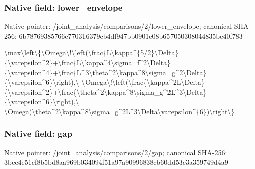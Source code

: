 \documentclass[10pt,a4paper]{article}
\begin{document}
\subsubsection{Native field: lower\_envelope}


Native pointer: /joint\_analysis/comparis\allowbreak{}ons/2/lower\_envelope; canonical SHA-256: 6b78769385766c770316379c\allowbreak{}b4df947bb0901e08b6570503\allowbreak{}08044835be40f783


\textbackslash{}max\textbackslash{}left\textbackslash{}\{\textbackslash{}Omega\textbackslash{}!\textbackslash{}left\allowbreak{}(\textbackslash{}frac\{L\textbackslash{}kappa\textasciicircum{}\{5/2\}\textbackslash{}Del\allowbreak{}ta\}\{\textbackslash{}varepsilon\textasciicircum{}2\}+\textbackslash{}frac\allowbreak{}\{L\textbackslash{}kappa\textasciicircum{}4\textbackslash{}sigma\_f\textasciicircum{}2\textbackslash{}Del\allowbreak{}ta\}\{\textbackslash{}varepsilon\textasciicircum{}4\}+\textbackslash{}frac\allowbreak{}\{L\textasciicircum{}3\textbackslash{}theta\textasciicircum{}2\textbackslash{}kappa\textasciicircum{}8\textbackslash{}sig\allowbreak{}ma\_g\textasciicircum{}2\textbackslash{}Delta\}\{\textbackslash{}varepsilo\allowbreak{}n\textasciicircum{}6\}\textbackslash{}right),\textbackslash{} \textbackslash{}Omega\textbackslash{}!\textbackslash{}left(\textbackslash{}frac\{\textbackslash{}kap\allowbreak{}pa\textasciicircum{}2L\textbackslash{}Delta\}\{\textbackslash{}varepsilon\allowbreak{}\textasciicircum{}2\}+\textbackslash{}frac\{\textbackslash{}theta\textasciicircum{}2\textbackslash{}kappa\allowbreak{}\textasciicircum{}8\textbackslash{}sigma\_g\textasciicircum{}2L\textasciicircum{}3\textbackslash{}Delta\}\{\textbackslash{}\allowbreak{}varepsilon\textasciicircum{}6\}\textbackslash{}right),\textbackslash{} \textbackslash{}Omega(\textbackslash{}theta\textasciicircum{}2\textbackslash{}kappa\textasciicircum{}8\textbackslash{}\allowbreak{}sigma\_g\textasciicircum{}2L\textasciicircum{}3\textbackslash{}Delta\textbackslash{}varep\allowbreak{}silon\textasciicircum{}\{6\})\textbackslash{}right\textbackslash{}\}


\subsubsection{Native field: gap}


Native pointer: /joint\_analysis/comparisons/2/gap; canonical SHA-256: 3bee4e51cf8b5bd8aa969b03\allowbreak{}4094f51a97a90996838cb60d\allowbreak{}d53c3a359749d4a9
\end{document}
